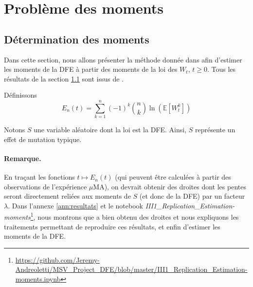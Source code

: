 \documentclass[12pt]{article}
\newtheorem{plain}{Proposition}[section]
\newcounter{prop}[section]
\newcommand{\req}[1]{\paragraph{Remarque.}#1\vspace{0.1cm}}
\newcommand{\prop}[1]{\begin{center}\fbox{\begin{minipage}{.8\linewidth}\begin{plain} #1\end{plain}\end{minipage}}\end{center}}
\newcommand{\pth}[1]{\left(#1\right)}
\newcommand{\cro}[1]{\left[#1\right]}
\newcommand{\En}{\mathbb{N}}
\newcommand{\Esp}[1]{\mathbb{E}\cro{#1}}
\begin{document}
\FloatBarrier
\section{Problème des moments}

\subsection{Détermination des moments}\label{ss:det_mom}


Dans cette section, nous allons présenter la méthode donnée dans \cite{rob} afin d'estimer les moments de la DFE à partir des moments de la loi des $W_t$, $t\geqslant 0$. Tous les résultats de la section \ref{ss:det_mom} sont issus de \cite{rob}.


Définissons \[E_n(t)=\sum_{k=1}^n(-1)^k\binom{n}{k}\ln\pth{\Esp{W_t^k}}\]

Notons $S$ une variable aléatoire dont la loi est la DFE. Ainsi, $S$ représente un effet de mutation typique.

\prop{Pour $t\geqslant 0$ et $n\in\En$: \[E_n(t)=\pth{\lambda\Esp{S^n}}t\]}

\req{En traçant les fonctions $t\mapsto E_n(t)$ (qui peuvent être calculées à partir des observations de l'expérience $\mu$MA), on devrait obtenir des droites dont les pentes seront directement reliées aux moments de $S$ (et donc de la DFE) par un facteur $\lambda$. Dans l'annexe \ref{ann:resultats} et le notebook \emph{III1\_Replication\_Estimation-moments}\footnote{\url{https://github.com/Jeremy-Andreoletti/MSV_Project_DFE/blob/master/III1_Replication_Estimation-moments.ipynb}}, nous montrons que \cite{rob} a bien obtenu des droites et nous expliquons les traitements permettant de reproduire ces résultats, et enfin d'estimer les moments de la DFE.}
\end{document}
